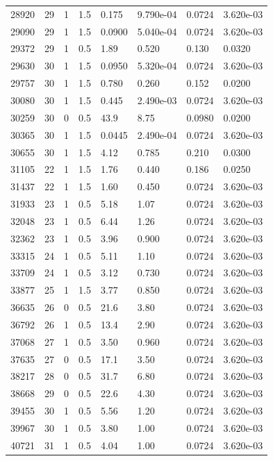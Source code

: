 \documentclass[preview]{standalone}
\begin{document}
{{{{\begin{tabular}{L{1.2cm}C{1.2cm} C{0.3cm}C{0.5cm} C{1.4cm}C{1.4cm} C{1.4cm}C{1.4cm}}
  28920  &    29  & 1     & 1.5 &  0.175  & 9.790e-04  & 0.0724 &  3.620e-03   \\ 
  29090  &    29  & 1     & 1.5 &  0.0900  & 5.040e-04  & 0.0724 &  3.620e-03   \\ 
  29372  &    29  & 1     & 0.5 &  1.89  & 0.520  & 0.130 &  0.0320   \\ 
  29630  &    30  & 1     & 1.5 &  0.0950  & 5.320e-04  & 0.0724 &  3.620e-03   \\ 
  29757  &    30  & 1     & 1.5 &  0.780  & 0.260  & 0.152 &  0.0200   \\ 
  30080  &    30  & 1     & 1.5 &  0.445  & 2.490e-03  & 0.0724 &  3.620e-03   \\ 
  30259  &    30  & 0     & 0.5 &  43.9  & 8.75  & 0.0980 &  0.0200   \\ 
  30365  &    30  & 1     & 1.5 &  0.0445  & 2.490e-04  & 0.0724 &  3.620e-03   \\ 
  30655  &    30  & 1     & 1.5 &  4.12  & 0.785  & 0.210 &  0.0300   \\ 
  31105  &    22  & 1     & 1.5 &  1.76  & 0.440  & 0.186 &  0.0250   \\ 
  31437  &    22  & 1     & 1.5 &  1.60  & 0.450  & 0.0724 &  3.620e-03   \\ 
  31933  &    23  & 1     & 0.5 &  5.18  & 1.07  & 0.0724 &  3.620e-03   \\ 
  32048  &    23  & 1     & 0.5 &  6.44  & 1.26  & 0.0724 &  3.620e-03   \\ 
  32362  &    23  & 1     & 0.5 &  3.96  & 0.900  & 0.0724 &  3.620e-03   \\ 
  33315  &    24  & 1     & 0.5 &  5.11  & 1.10  & 0.0724 &  3.620e-03   \\ 
  33709  &    24  & 1     & 0.5 &  3.12  & 0.730  & 0.0724 &  3.620e-03   \\ 
  33877  &    25  & 1     & 1.5 &  3.77  & 0.850  & 0.0724 &  3.620e-03   \\ 
  36635  &    26  & 0     & 0.5 &  21.6  & 3.80  & 0.0724 &  3.620e-03   \\ 
  36792  &    26  & 1     & 0.5 &  13.4  & 2.90  & 0.0724 &  3.620e-03   \\ 
  37068  &    27  & 1     & 0.5 &  3.50  & 0.960  & 0.0724 &  3.620e-03   \\ 
  37635  &    27  & 0     & 0.5 &  17.1  & 3.50  & 0.0724 &  3.620e-03   \\ 
  38217  &    28  & 0     & 0.5 &  31.7  & 6.80  & 0.0724 &  3.620e-03   \\ 
  38668  &    29  & 0     & 0.5 &  22.6  & 4.30  & 0.0724 &  3.620e-03   \\ 
  39455  &    30  & 1     & 0.5 &  5.56  & 1.20  & 0.0724 &  3.620e-03   \\ 
  39967  &    30  & 1     & 0.5 &  3.80  & 1.00  & 0.0724 &  3.620e-03   \\ 
  40721  &    31  & 1     & 0.5 &  4.04  & 1.00  & 0.0724 &  3.620e-03   \\ 
\hline 
\end{tabular} 

}}}}
\end{document}
